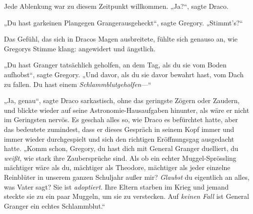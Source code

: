 Jede Ablenkung war zu diesem Zeitpunkt willkommen. „Ja?“, sagte Draco.

„Du hast garkeinen Plangegen Grangerausgeheckt“, sagte Gregory. „Stimmt’s?“

Das Gefühl, das sich in Dracos Magen ausbreitete, fühlte sich genauso an, wie Gregorys Stimme klang: angewidert und ängstlich.

„Du hast Granger tatsächlich geholfen, an dem Tag, als du sie vom Boden aufhobst“, sagte Gregory. „Und davor, als du sie davor bewahrt hast, vom Dach zu fallen. Du hast einem \emph{Schlammblutgeholfen}—“

„Ja, genau“, sagte Draco sarkastisch, ohne das geringste Zögern oder Zaudern, und blickte wieder auf seine Astronomie-Hausaufgaben hinunter, als wäre er nicht im Geringsten nervös. Es geschah alles so, wie Draco es befürchtet hatte, aber das bedeutete zumindest, dass er dieses Gespräch in seinem Kopf immer und immer wieder durchgespielt und sich den richtigen Eröffnungsgag ausgedacht hatte. „Komm schon, Gregory, du hast dich mit General Granger duelliert, du \emph{weißt}, wie stark ihre Zaubersprüche sind. Als ob ein echter Muggel-Sprössling mächtiger wäre als du, mächtiger als Theodore, mächtiger als jeder einzelne Reinblüter in unserem ganzen Schuljahr außer mir? \emph{Glaubst} du eigentlich an alles, was Vater sagt? Sie ist \emph{adoptiert}. Ihre Eltern starben im Krieg und jemand steckte sie zu ein paar Muggeln, um sie zu verstecken. Auf \emph{keinen Fall} ist General Granger ein echtes Schlammblut.“

